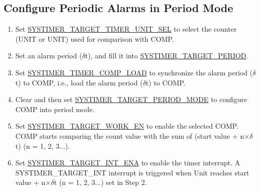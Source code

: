 \documentclass[main\_\_EN.tex]{subfiles}
\begin{document}
\subsection{Configure Periodic Alarms in Period Mode}
\begin{enumerate}
    \item Set \hyperref[fielddesc:SYSTIMERTARGET0TIMERUNITSEL]{SYSTIMER\_TARGET\_TIMER\_UNIT\_SEL} to select the counter (UNIT or UNIT) used for comparison with COMP.
    \item Set an alarm period ($\delta$t), and fill it into \hyperref[fielddesc:SYSTIMERTARGET0PERIOD]{SYSTIMER\_TARGET\_PERIOD}.
    \item Set \hyperref[fielddesc:SYSTIMERTIMERCOMP0LOAD]{SYSTIMER\_TIMER\_COMP\_LOAD} to synchronize the alarm period ($\delta$t) to COMP, i.e., load the alarm period ($\delta$t) to COMP.
    \item Clear and then set \hyperref[fielddesc:SYSTIMERTARGET0PERIODMODE]{SYSTIMER\_TARGET\_PERIOD\_MODE} to configure COMP into period mode.
    \item Set \hyperref[fielddesc:SYSTIMERTARGET0WORKEN]{SYSTIMER\_TARGET\_WORK\_EN} to enable the selected COMP. COMP starts comparing the count value with the sum of (start value + n×$\delta$t) (n = 1, 2, 3...).
    \item Set \hyperref[fielddesc:SYSTIMERTARGET0INTENA]{SYSTIMER\_TARGET\_INT\_ENA} to enable the timer interrupt. A SYSTIMER\_TARGET\_INT interrupt is triggered when Unit reaches start value + n×$\delta$t (n = 1, 2, 3...) set in Step 2.
\end{enumerate}
\end{document}
